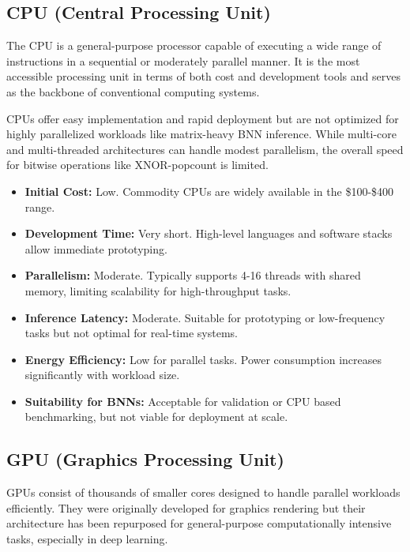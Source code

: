 \documentclass[a4paper,12pt]{report}
\begin{document}
\subsection{CPU (Central Processing Unit)}
The CPU is a general-purpose processor capable of executing a wide range of instructions in a sequential or moderately parallel manner. It is the most accessible processing unit in terms of both cost and development tools and serves as the backbone of conventional computing systems.

CPUs offer easy implementation and rapid deployment but are not optimized for highly parallelized workloads like matrix-heavy BNN inference. While multi-core and multi-threaded architectures can handle modest parallelism, the overall speed for bitwise operations like XNOR-popcount is limited.
\begin{itemize}
    \item \textbf{Initial Cost:} Low. Commodity CPUs are widely available in the \$100-\$400 range.
    \item \textbf{Development Time:} Very short. High-level languages and software stacks allow immediate prototyping.
    \item \textbf{Parallelism:} Moderate. Typically supports 4-16 threads with shared memory, limiting scalability for high-throughput tasks.
    \item \textbf{Inference Latency:} Moderate. Suitable for prototyping or low-frequency tasks but not optimal for real-time systems.
    \item \textbf{Energy Efficiency:} Low for parallel tasks. Power consumption increases significantly with workload size.
    \item \textbf{Suitability for BNNs:} Acceptable for validation or CPU based benchmarking, but not viable for deployment at scale.
\end{itemize}

\subsection{GPU (Graphics Processing Unit)}
GPUs consist of thousands of smaller cores designed to handle parallel workloads efficiently. They were originally developed for graphics rendering but their architecture has been repurposed for general-purpose computationally intensive tasks, especially in deep learning.
\end{document}
